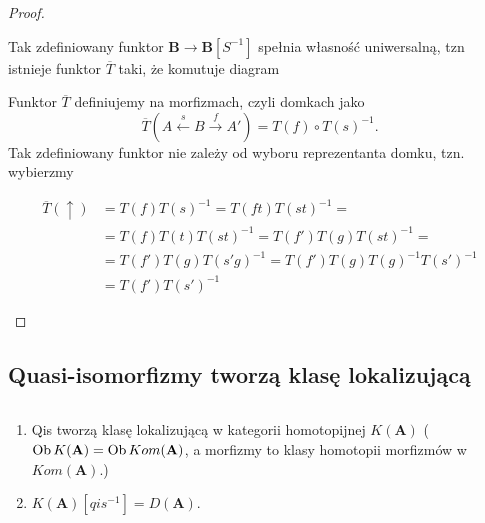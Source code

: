 \begin{proof}
\begin{enumerate}
  Tak zdefiniowany funktor $\mathbf{B}\to \mathbf{B}[S^{-1}]$ spełnia własność uniwersalną, tzn istnieje funktor $\overline{T}$ taki, że komutuje diagram
  \begin{center}\end{center}
  Funktor $\overline{T}$ definiujemy na morfizmach, czyli domkach jako
  $$
  \overline{T}(A \xleftarrow{s}B\xrightarrow{f} A') = 
  T(f)\circ T(s)^{-1}.
  $$
  Tak zdefiniowany funktor nie zależy od wyboru reprezentanta domku, tzn. wybierzmy
  \begin{center}\end{center}
  \begin{align*}
    \overline{T}(\uparrow)&=T(f)T(s)^{-1}=T(ft)T(st)^{-1}=\\ 
                          &=T(f)T(t)T(st)^{-1}=T(f')T(g)T(st)^{-1}=\\ 
                          &=T(f')T(g)T(s'g)^{-1}=T(f')T(g)T(g)^{-1}T(s')^{-1}\\ 
                          &=T(f')T(s')^{-1}
  \end{align*}
  \end{enumerate}
\end{proof}

\subsection{Quasi-isomorfizmy tworzą klasę lokalizującą}

\begin{theorem}$ $

  \begin{enumerate}
    \item Qis tworzą klasę lokalizującą w kategorii homotopijnej $K(\mathbf{A})$ ($\operatorname{Ob} K(\mathbf{A})=\operatorname{Ob} Kom(\mathbf{A})$, a morfizmy to klasy homotopii morfizmów w $Kom(\mathbf{A})$.)
    \item $K(\mathbf{A})[qis^{-1}]=D(\mathbf{A})$.
  \end{enumerate}
\end{theorem}



